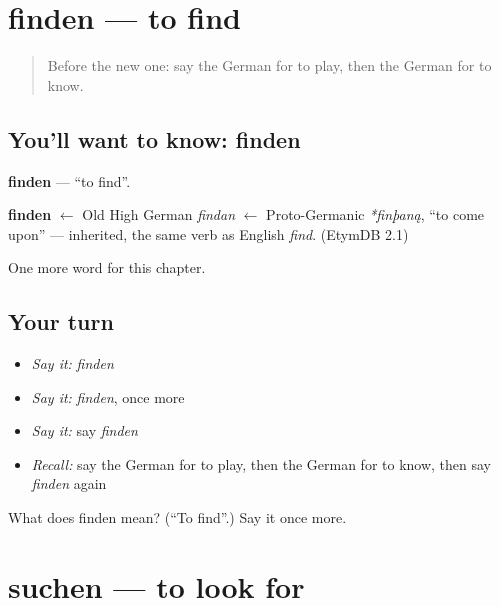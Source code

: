\section[finden]{finden — to find}

\label{lesson:GE-C64-finden}



\begin{quote}
Before the new one: say the German for to play, then the German for to know.
\end{quote}

\subsection*{You'll want to know: finden}
\textbf{finden} — \textquotedblleft{}to find\textquotedblright{}.

\begin{cousinweb}
\textbf{finden} $\leftarrow$ Old High German \emph{findan} $\leftarrow$ Proto-Germanic \emph{*finþaną}, \textquotedblleft{}to come upon\textquotedblright{} — inherited, the same verb as English \emph{find}. (EtymDB 2.1)
\end{cousinweb}

\begin{grammarlens}[title={What you've built}]
One more word for this chapter.
\end{grammarlens}

\subsection*{Your turn}
\begin{itemize}
\raggedright
  \item \emph{Say it:} \emph{finden}
  \item \emph{Say it:} \emph{finden}, once more
  \item \emph{Say it:} say \emph{finden}
  \item \emph{Recall:} say the German for to play, then the German for to know, then say \emph{finden} again
\end{itemize}

\begin{tcolorbox}[breakable,colback=teal!4,colframe=teal!35!black,title={Before you move on}]
What does finden mean? (\textquotedblleft{}To find\textquotedblright{}.) Say it once more.
\end{tcolorbox}
\section[suchen]{suchen — to look for}

